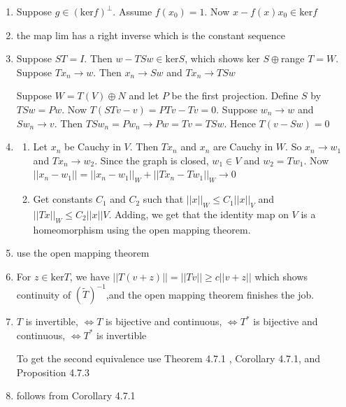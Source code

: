 \documentclass{article}
\begin{document}
\begin{enumerate}
    \item Suppose $g \in (\text{ker}f)^\perp$. Assume $f(x_0)=1$. Now $x-f(x)x_0 \in \text{ker}f$
    \item the map lim has a right inverse which is the constant sequence

    \item Suppose $ST=I$. Then $w-TSw \in \text{ker}S$, which shows ker $S \oplus$range $T=W$. Suppose $Tx_n \to w$. Then $x_n \to Sw$ and $Tx_n \to TSw$

    Suppose $W=T(V) \oplus N$ and let $P$ be the first projection. Define $S$ by $TSw=Pw$. Now $T(STv-v)=PTv-Tv=0$. Suppose $w_n \to w$ and $Sw_n \to v$. Then $TSw_n=Pw_n \to Pw=Tv=TSw$. Hence $T(v-Sw)=0$

    \item \begin{enumerate}
        \item 
            Let $x_n$ be Cauchy in $V$. Then $Tx_n$ and $x_n$ are Cauchy in $W$. So $x_n \to w_1$ and $Tx_n \to w_2$. Since the graph is closed, $w_1 \in V$ and $w_2=Tw_1$. Now $||x_n-w_1||=||x_n-w_1||_W+||Tx_n-Tw_1||_W \to 0$
        \item 
        Get constants $C_1$ and $C_2$ such that $||x||_W \leq C_1||x||_V$ and $||Tx||_W \leq C_2||x||V$. Adding, we get that the identity map on $V$ is a homeomorphism using the open mapping theorem.
    \end{enumerate}

    \item use the open mapping theorem

    \item For $z \in \text{ker}T$, we have $||T(v+z)|| =||Tv|| \geq c||v+z||$ which shows continuity of $(\tilde{T})^{-1}$,and the open mapping theorem finishes the job.

    \item $T$ is invertible, $\iff T$ is bijective and continuous, $\iff T^*$ is bijective and continuous, $\iff T^*$ is invertible

    To get the second equivalence use Theorem 4.7.1 , Corollary 4.7.1, and Proposition 4.7.3

    \item follows from Corollary 4.7.1
\end{enumerate}
\end{document}
